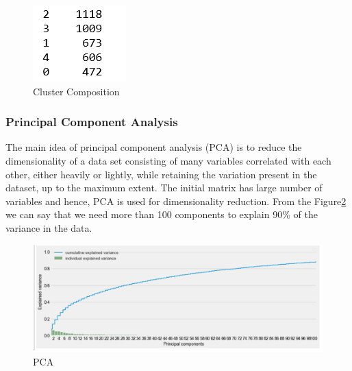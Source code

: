 \begin{figure}
\caption{Cluster Composition}
\label{3.4}
\centering
\includegraphics[width=\columnwidth]{images/3_4.PNG}
\end{figure}

\subsubsection{\textbf{Principal Component Analysis}}

The main idea of principal component analysis (PCA) is to reduce the dimensionality of a data set consisting of many variables correlated with each other, either heavily or lightly, while retaining the variation present in the dataset, up to the maximum extent. The initial matrix has large number of variables and hence, PCA is used for dimensionality reduction. From the Figure\ref{3.5} we can say that we need more than 100 components to explain 90\% of the variance in the data.\\

\begin{figure}
\caption{PCA}
\label{3.5}
\centering
\includegraphics[width=\columnwidth]{images/3_5.PNG}
\end{figure}

